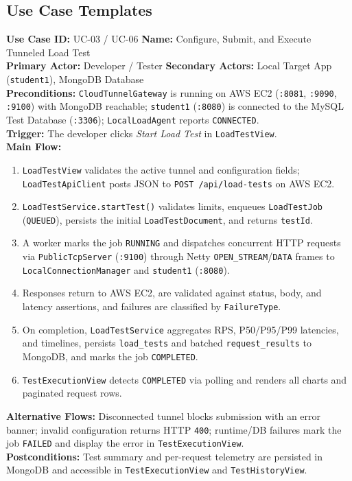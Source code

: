 \documentclass[11pt,a4paper]{report}
\begin{document}
\subsection{Use Case Templates}

\textbf{Use Case ID:} UC-03 / UC-06 \quad \textbf{Name:} Configure, Submit, and Execute Tunneled Load Test\\
\textbf{Primary Actor:} Developer / Tester \quad \textbf{Secondary Actors:} Local Target App (\texttt{student1}), MongoDB Database\\
\textbf{Preconditions:} \texttt{CloudTunnelGateway} is running on AWS EC2 (\texttt{:8081}, \texttt{:9090}, \texttt{:9100}) with MongoDB reachable; \texttt{student1} (\texttt{:8080}) is connected to the MySQL Test Database (\texttt{:3306}); \texttt{LocalLoadAgent} reports \texttt{CONNECTED}.\\
\textbf{Trigger:} The developer clicks \textit{Start Load Test} in \texttt{LoadTestView}.\\
\textbf{Main Flow:}
\begin{enumerate}
  \item \texttt{LoadTestView} validates the active tunnel and configuration fields; \texttt{LoadTestApiClient} posts JSON to \texttt{POST /api/load-tests} on AWS EC2.
  \item \texttt{LoadTestService.startTest()} validates limits, enqueues \texttt{LoadTestJob} (\texttt{QUEUED}), persists the initial \texttt{LoadTestDocument}, and returns \texttt{testId}.
  \item A worker marks the job \texttt{RUNNING} and dispatches concurrent HTTP requests via \texttt{PublicTcpServer} (\texttt{:9100}) through Netty \texttt{OPEN\_STREAM}/\texttt{DATA} frames to \texttt{LocalConnectionManager} and \texttt{student1} (\texttt{:8080}).
  \item Responses return to AWS EC2, are validated against status, body, and latency assertions, and failures are classified by \texttt{FailureType}.
  \item On completion, \texttt{LoadTestService} aggregates RPS, P50/P95/P99 latencies, and timelines, persists \texttt{load\_tests} and batched \texttt{request\_results} to MongoDB, and marks the job \texttt{COMPLETED}.
  \item \texttt{TestExecutionView} detects \texttt{COMPLETED} via polling and renders all charts and paginated request rows.
\end{enumerate}
\textbf{Alternative Flows:} Disconnected tunnel blocks submission with an error banner; invalid configuration returns HTTP \texttt{400}; runtime/DB failures mark the job \texttt{FAILED} and display the error in \texttt{TestExecutionView}.\\
\textbf{Postconditions:} Test summary and per-request telemetry are persisted in MongoDB and accessible in \texttt{TestExecutionView} and \texttt{TestHistoryView}.
\end{document}

